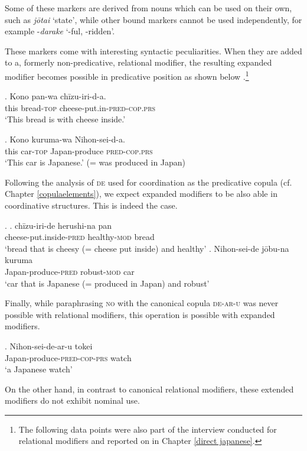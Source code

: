 \documentclass [output=book,colorlinks,citecolor=brown]{langscibook}
\begin{document}
Some of these markers are derived from nouns which can be used on their own, such as \textit{jōtai} `state’, while other bound markers cannot be used independently, for example -\textit{darake} `-ful, -ridden’.

These markers come with interesting syntactic peculiarities. When they are added to a, formerly non-predicative, relational modifier, the resulting expanded modifier becomes possible in predicative position as shown below \citep{nagano:2016:are, shimada:2018:relational}.\footnote{The following data points were also part of the interview conducted for relational modifiers and reported on in Chapter \ref{direct japanese}.}

\exg. Kono pan-wa chīzu-iri-d-a.\\
this bread-\textsc{top} cheese-put.in-\textsc{pred-cop.prs}\\
`This bread is with cheese inside.’

\exg. Kono kuruma-wa Nihon-sei-d-a.\\
this car-\textsc{top} Japan-produce \textsc{pred-cop.prs}\\
`This car is Japanese.’ (= was produced in Japan)

Following the analysis of \textsc{de} used for coordination as the predicative copula (cf. Chapter \ref{copulaelements}), we expect expanded modifiers to be also able in coordinative structures. This is indeed the case. %

\newpage

\ex. \ag. chīzu-iri-de herushi-na pan\\
cheese-put.inside-\textsc{pred} healthy-\textsc{mod} bread\\
`bread that is cheesy (= cheese put inside) and healthy'
\bg. Nihon-sei-de jōbu-na kuruma\\
Japan-produce-\textsc{pred} robust-\textsc{mod} car\\
`car that is Japanese (= produced in Japan) and robust'

Finally, while paraphrasing \textsc{no} with the canonical copula \textsc{de-ar-u} was never possible with relational modifiers, this operation is possible with expanded modifiers.

\exg. Nihon-sei-de-ar-u tokei\\
Japan-produce-\textsc{pred-cop-prs} watch\\
`a Japanese watch' \null \hfill \citep[75]{shimada:2018:relational}

On the other hand, in contrast to canonical relational modifiers, these extended modifiers do not exhibit nominal use.
\end{document}
